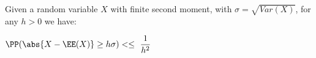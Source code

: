 
Given a random variable $X$ with finite second moment, with $\sigma = \sqrt{Var(X)}$, for any $h >0$ we have:

	$\PP(\abs{X-\EE(X)} \geq h \sigma ) <\leq \ \dfrac{1}{h^2} $

